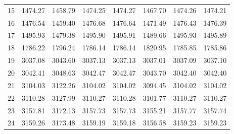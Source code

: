 \documentclass[10pt,oneside]{article}
\begin{document}
\begin{table}[h!]
\begin{tabular}{cccccccc}
15 &   1474.27 & 1458.79 & 1474.25 &    1474.27 &      1467.70 & 1474.26 &   1474.21 \\
16 &   1476.54 & 1459.40 & 1476.68 &    1476.64 &      1471.49 & 1476.43 &   1476.39 \\
17 &   1495.93 & 1479.38 & 1495.90 &    1495.91 &      1489.66 & 1495.93 &   1495.89 \\
18 &   1786.22 & 1796.24 & 1786.14 &    1786.14 &      1820.95 & 1785.85 &   1785.86 \\
19 &   3037.08 & 3043.60 & 3037.13 &    3037.13 &      3037.01 & 3037.09 &   3037.10 \\
20 &   3042.41 & 3048.63 & 3042.47 &    3042.47 &      3043.70 & 3042.40 &   3042.40 \\
21 &   3104.03 & 3122.26 & 3104.02 &    3104.02 &      3094.45 & 3104.02 &   3104.02 \\
22 &   3110.28 & 3127.99 & 3110.27 &    3110.28 &      3101.77 & 3110.27 &   3110.27 \\
23 &   3157.81 & 3172.13 & 3157.73 &    3157.73 &      3155.21 & 3157.77 &   3157.74 \\
24 &   3159.26 & 3173.48 & 3159.19 &    3159.18 &      3156.58 & 3159.23 &   3159.23 \\
\bottomrule
\end{tabular}
\end{table}
\end{document}

